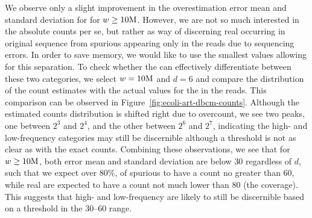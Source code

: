 We observe only a slight improvement in the overestimation error mean and standard deviation for for $w\geq 10\mega$. However, we are not so much interested in the absolute counts per se, but rather as way of discerning real \kmers occurring in original sequence from spurious \kmers appearing only in the reads due to sequencing errors. In order to save memory, we would like to use the smallest values allowing for this separation.
To check whether the \dBCM can effectively differentiate between these two categories, we select $w=10\mega$ and $d=6$ and compare the distribution of the count estimates with the actual values for the  in the reads. This comparison can be observed in Figure~\ref{fig:ecoli-art-dbcm-counts}.   Although the estimated counts distribution is shifted right due to overcount, we see two peaks, one between $2^3$ and $2^4$, and the other between $2^6$ and $2^7$, indicating the high- and low-frequency categories may still be discernible although a threshold is not as clear as with the exact counts.
Combining these observations, we see that for $w \geq 10\mega$, both error mean and standard deviation are below $30$ regardless of $d$, such that we expect over $80\%$, of spurious  to have a count no greater than $60$, while real  are expected to have a count not much lower than $80$ (the coverage). This suggests that high- and low-frequency  are likely to still be discernible based on a threshold in the 30--60 range.


